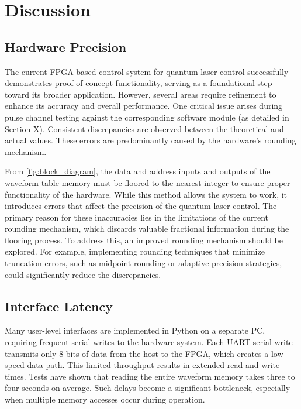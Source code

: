 \chapter{Discussion}

\section{Hardware Precision}

The current FPGA-based control system for quantum laser control successfully demonstrates proof-of-concept functionality, serving as a foundational step toward its broader application. However, several areas require refinement to enhance its accuracy and overall performance. One critical issue arises during pulse channel testing against the corresponding software module (as detailed in Section X). Consistent discrepancies are observed between the theoretical and actual values. These errors are predominantly caused by the hardware's rounding mechanism.

From \autoref{fig:block_diagram}, the data and address inputs and outputs of the waveform table memory must be floored to the nearest integer to ensure proper functionality of the hardware. While this method allows the system to work, it introduces errors that affect the precision of the quantum laser control. The primary reason for these inaccuracies lies in the limitations of the current rounding mechanism, which discards valuable fractional information during the flooring process. To address this, an improved rounding mechanism should be explored. For example, implementing rounding techniques that minimize truncation errors, such as midpoint rounding or adaptive precision strategies, could significantly reduce the discrepancies.

\section{Interface Latency}
Many user-level interfaces are implemented in Python on a separate PC, requiring frequent serial writes to the hardware system. Each UART serial write transmits only 8 bits of data from the host to the FPGA, which creates a low-speed data path. This limited throughput results in extended read and write times. Tests have shown that reading the entire waveform memory takes three to four seconds on average. Such delays become a significant bottleneck, especially when multiple memory accesses occur during operation.

